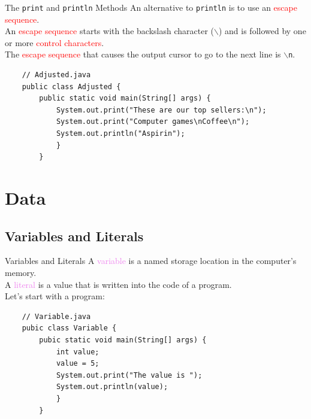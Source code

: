 \documentclass[11pt]{beamer}
\newcommand{\red}[1]{\textcolor{red}{#1}}
\newcommand{\violet}[1]{\textcolor{violet}{#1}}
\begin{document}
\begin{frame}[fragile]{The \texttt{print} and \texttt{println} Methods}
    An alternative to \texttt{println} is to use an \red{escape sequence}. \\ \vspace{1em}
    An \red{escape sequence} starts with the backslash character ($\backslash$) and is followed by one or more \red{control characters}. \\ \vspace{1em}
    The \red{escape sequence} that causes the output cursor to go to the next line is \texttt{$\backslash$n}.
    \begin{lstlisting}
    // Adjusted.java
    public class Adjusted {
        public static void main(String[] args) {
            System.out.print("These are our top sellers:\n");
            System.out.print("Computer games\nCoffee\n");
            System.out.println("Aspirin");
            }
        }
    \end{lstlisting}
\end{frame}

\section{Data}
\subsection{Variables and Literals}
\begin{frame}[fragile]{Variables and Literals}
    A \violet{variable} is a named storage location in the computer's memory. \\ \vspace{1em} 
    A \violet{literal} is a value that is written into the code of a program. \\ \vspace{1em}
    Let's start with a program:
    \begin{lstlisting}
    // Variable.java
    pubic class Variable {
        pubic static void main(String[] args) {
            int value;
            value = 5;
            System.out.print("The value is ");
            System.out.println(value);
            }
        }
    \end{lstlisting}
\end{frame}
\end{document}
